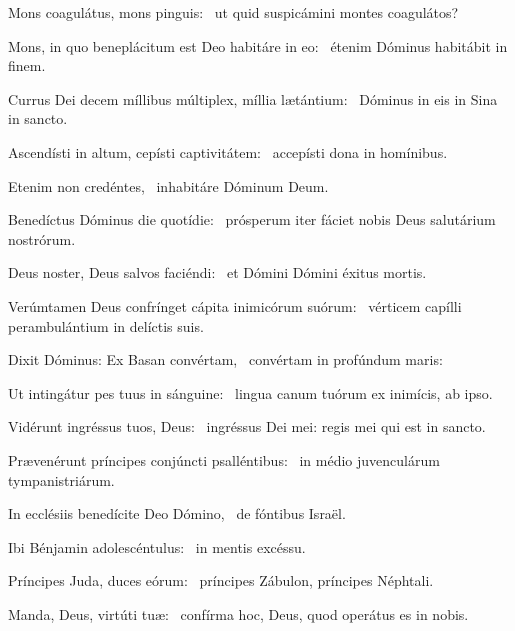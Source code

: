 \item Mons coagulátus, mons pinguis:~\psstar{} ut quid suspicámini montes coagulátos?

\item Mons, in quo beneplácitum est Deo habitáre in eo:~\psstar{} étenim Dóminus habitábit in finem.

\item Currus Dei decem míllibus múltiplex, míllia lætántium:~\psstar{} Dóminus in eis in Sina in sancto.

\item Ascendísti in altum, cepísti captivitátem:~\psstar{} accepísti dona in homínibus.

\item Etenim non credéntes,~\psstar{} inhabitáre Dóminum Deum.

\item Benedíctus Dóminus die quotídie:~\psstar{} prósperum iter fáciet nobis Deus salutárium nostrórum.

\item Deus noster, Deus salvos faciéndi:~\psstar{} et Dómini Dómini éxitus mortis.

\item Verúmtamen Deus confrínget cápita inimicórum suórum:~\psstar{} vérticem capílli perambulántium in delíctis suis.

\item Dixit Dóminus: Ex Basan convértam,~\psstar{} convértam in profúndum maris:

\item Ut intingátur pes tuus in sánguine:~\psstar{} lingua canum tuórum ex inimícis, ab ipso.

\item Vidérunt ingréssus tuos, Deus:~\psstar{} ingréssus Dei mei: regis mei qui est in sancto.

\item Prævenérunt príncipes conjúncti psalléntibus:~\psstar{} in médio juvenculárum tympanistriárum.

\item In ecclésiis benedícite Deo Dómino,~\psstar{} de fóntibus Israël.

\item Ibi Bénjamin adolescéntulus:~\psstar{} in mentis excéssu.

\item Príncipes Juda, duces eórum:~\psstar{} príncipes Zábulon, príncipes Néphtali.

\item Manda, Deus, virtúti tuæ:~\psstar{} confírma hoc, Deus, quod operátus es in nobis.

